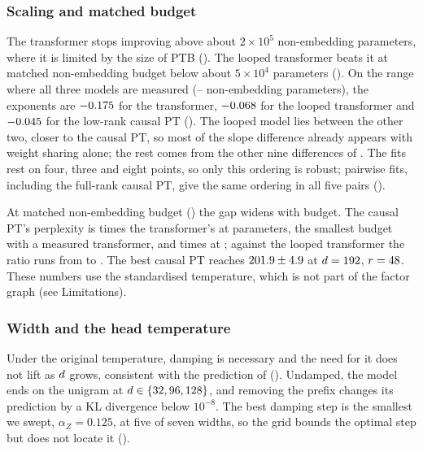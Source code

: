 \subsubsection{Scaling and matched budget}
\label{sec:exp-scaling}
The transformer stops improving above about $2\times10^5$ non-embedding parameters, where it is
limited by the size of PTB (). The looped transformer beats it at matched
non-embedding budget below about $5\times10^4$ parameters (). On
the range where all three models are
measured (\ExpTriLo--\ExpTriHi{} non-embedding parameters), the exponents are $-0.175$ for the
transformer, $-0.068$ for the looped transformer and $-0.045$ for the low-rank causal PT
(). The looped model lies between the other two, closer to the causal
PT, so most of the slope difference already appears with weight sharing alone; the rest comes
from the other nine differences of . The fits rest on four, three and
eight points, so only this ordering is robust; pairwise fits, including the full-rank causal PT,
give the same ordering in all five pairs ().

At matched non-embedding budget () the gap widens with budget. The causal PT's
perplexity is \MBFirstRatioGpt{} times the transformer's at \MBFirstNonemb{} parameters, the
smallest budget with a measured transformer, and \MBLastRatioGpt{} times at \MBLastNonemb{};
against the looped transformer the ratio runs from \MBFirstRatioLooped{} to
\MBLastRatioLooped. The best causal PT reaches $201.9 \pm 4.9$ at
$d=192$, $r=48$. These numbers use the standardised temperature, which
is not part of the factor graph (see Limitations).

\subsubsection{Width and the head temperature}
\label{sec:exp-width}
Under the original temperature, damping is necessary and the need for it does not lift as
$d$ grows, consistent with the prediction of 
(). Undamped, the model ends on the unigram at $d\in\{32,96,128\}$,
and removing the prefix changes its prediction by a KL divergence below $10^{-8}$. The best
damping step is the smallest we swept, $\alpha_Z=0.125$, at five of seven widths, so the grid
bounds the optimal step but does not locate it ().

